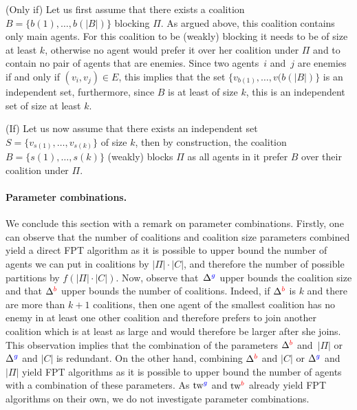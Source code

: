 \documentclass[a4paper,fleqn]{cas-sc}
\newcommand{\friendshipColor}{blue}
\newcommand{\enemyColor}{red}
\newcommand{\agent}{agent\xspace}
\newcommand{\agents}{agents\xspace}
\newcommand{\partition}{\ensuremath{\Pi}\xspace}
\newcommand{\coalition}{\ensuremath{C}\xspace}
\newcommand{\blockingCoalition}{\ensuremath{B}\xspace}
\newcommand{\friendSuperscript}{{\color{\friendshipColor}g}}
\newcommand{\enemySuperscript}{{\color{\enemyColor}b}}
\newcommand{\maxDegree}{\ensuremath{\Delta}}
\newcommand{\maxDegreeFriend}{\ensuremath{\maxDegree^{\friendSuperscript}}\xspace}
\newcommand{\maxDegreeEnemy}{\ensuremath{\maxDegree^{\enemySuperscript}}\xspace}
\newcommand{\treewidth}{\ensuremath{\text{tw}}}
\newcommand{\treewidthFriend}{\ensuremath{\treewidth^{\friendSuperscript}}\xspace}
\newcommand{\treewidthEnemy}{\ensuremath{\treewidth^{\enemySuperscript}}\xspace}
\newcommand{\maxCoalitionSize}{\ensuremath{|\coalition|}\xspace}
\newcommand{\maxNumberOfCoalitions}{\ensuremath{|\partition|}\xspace}
\begin{document}
{    (Only if) Let us first assume that there exists a coalition $\blockingCoalition=\{b(1), \dots, b(|\blockingCoalition|)\}$ blocking \partition. As argued above, this coalition contains only main \agents. For this coalition to be (weakly) blocking it needs to be of size at least $k$, otherwise no \agent would prefer it over her coalition under \partition and to contain no pair of \agents that are enemies. Since two \agents~$i$ and~$j$ are enemies if and only if $(v_i,v_j) \in E$, this implies that the set $\{v_{b(1)}, \dots, v(b(|\blockingCoalition|)\}$ is an independent set, furthermore, since \blockingCoalition is at least of size $k$, this is an independent set of size at least $k$.

    (If) Let us now assume that there exists an independent set $S=\{v_{s(1)}, \dots, v_{s(k)}\}$ of size $k$, then by construction, the coalition $\blockingCoalition=\{s(1),\dots,s(k)\}$ (weakly) blocks \partition as all \agents in it prefer \blockingCoalition over their coalition under \partition.
}

\paragraph{Parameter combinations.} We conclude this section with a remark on parameter combinations. Firstly, one can observe that the number of coalitions and coalition size parameters combined yield a direct FPT algorithm as it is possible to upper bound the number of \agents we can put in coalitions by $\maxNumberOfCoalitions \cdot \maxCoalitionSize$, and therefore the number of possible partitions by $f(\maxNumberOfCoalitions \cdot \maxCoalitionSize)$. Now, observe that~\maxDegreeFriend upper bounds the coalition size and that \maxDegreeEnemy upper bounds the number of coalitions.
Indeed, if \maxDegreeEnemy is $k$ and there are more than $k+1$ coalitions, then one agent of the smallest coalition has no enemy in at least one other coalition and therefore prefers to join another coalition which is at least as large and would therefore be larger after she joins.
This observation implies that the combination of the parameters $\maxDegreeEnemy$ and~$\maxNumberOfCoalitions$ or $\maxDegreeFriend$ and $\maxCoalitionSize$ is redundant. On the other hand, combining \maxDegreeEnemy and \maxCoalitionSize or \maxDegreeFriend and \maxNumberOfCoalitions yield FPT algorithms as it is possible to upper bound the number of agents with a combination of these parameters.
As \treewidthFriend and \treewidthEnemy already yield FPT algorithms on their own, we do not investigate parameter combinations.
\end{document}

